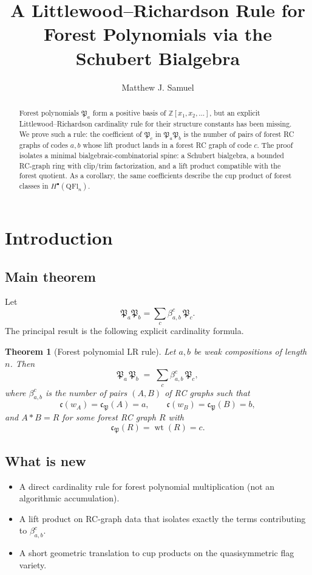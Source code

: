 \documentclass{amsart}
\title[Forest LR Rule via Schubert Bialgebra]{A Littlewood--Richardson Rule for Forest Polynomials via the Schubert Bialgebra}
\author{Matthew J. Samuel}
\newtheorem{theorem}{Theorem}[section]
\theoremstyle{definition}
\theoremstyle{remark}
\newcommand{\forest}{\mathfrak{P}}
\newcommand{\code}{\mathfrak{c}}
\newcommand{\wtt}{\operatorname{wt}}
\newcommand{\wof}[1]{w_{#1}}
\begin{document}
\begin{abstract}
Forest polynomials $\forest_a$ form a positive basis of $\mathbb{Z}[x_1,x_2,\ldots]$, but an explicit Littlewood--Richardson cardinality rule for their structure constants has been missing. We prove such a rule: the coefficient of $\forest_c$ in $\forest_a\forest_b$ is the number of pairs of forest RC graphs of codes $a,b$ whose lift product lands in a forest RC graph of code $c$. The proof isolates a minimal bialgebraic-combinatorial spine: a Schubert bialgebra, a bounded RC-graph ring with clip/trim factorization, and a lift product compatible with the forest quotient. As a corollary, the same coefficients describe the cup product of forest classes in $H^\bullet(\mathrm{QFl}_n)$.
\end{abstract}

\maketitle

\section{Introduction}

\subsection*{Main theorem}
Let
\[
\forest_a\forest_b=\sum_c \beta_{a,b}^c\,\forest_c.
\]
The principal result is the following explicit cardinality formula.

\begin{theorem}[Forest polynomial LR rule]\label{theorem:forestpolyLR}
Let $a,b$ be weak compositions of length $n$. Then
\[
\forest_a\,\forest_b \;=\; \sum_c \beta_{a,b}^c\,\forest_c,
\]
where $\beta_{a,b}^c$ is the number of pairs $(A,B)$ of RC graphs such that
\[
\code(\wof{A})=\code_{\forest}(A)=a,\qquad \code(\wof{B})=\code_{\forest}(B)=b,
\]
and $A*B=R$ for some forest RC graph $R$ with
\[
\code_{\forest}(R)=\wtt(R)=c.
\]
\end{theorem}

\subsection*{What is new}
\begin{itemize}
\item A direct cardinality rule for forest polynomial multiplication (not an algorithmic accumulation).
\item A lift product on RC-graph data that isolates exactly the terms contributing to $\beta_{a,b}^c$.
\item A short geometric translation to cup products on the quasisymmetric flag variety.
\end{itemize}
\end{document}
